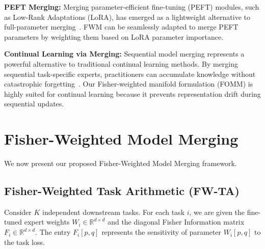 \documentclass{article}
\theoremstyle{plain}
\theoremstyle{definition}
\theoremstyle{remark}
\begin{document}
\textbf{PEFT Merging:} Merging parameter-efficient fine-tuning (PEFT) modules, such as Low-Rank Adaptations (LoRA), has emerged as a lightweight alternative to full-parameter merging~\cite{Zhang2023LoRAPruneSP, Zeng2025RobustMergePM, Zeng2025ParameterEM, Rivera2025COLORAEF, Quarantiello2024AdaptiveLM, Zhang2025LoRIRC}. FWM can be seamlessly adapted to merge PEFT parameters by weighting them based on LoRA parameter importance.

\textbf{Continual Learning via Merging:} Sequential model merging represents a powerful alternative to traditional continual learning methods. By merging sequential task-specific experts, practitioners can accumulate knowledge without catastrophic forgetting~\cite{Marczak2024MagMaxLM, Sokar2025ContinualLI, Feng2025AIMMergingAI, Yang2025OptimizedMM, Wang2026RevitalizingTB}. Our Fisher-weighted manifold formulation (FOMM) is highly suited for continual learning because it prevents representation drift during sequential updates.

\section{Fisher-Weighted Model Merging}
\label{sec:method}

We now present our proposed Fisher-Weighted Model Merging framework.

\subsection{Fisher-Weighted Task Arithmetic (FW-TA)}
Consider $K$ independent downstream tasks. For each task $i$, we are given the fine-tuned expert weights $W_i \in \mathbb{R}^{d \times d}$ and the diagonal Fisher Information matrix $F_i \in \mathbb{R}^{d \times d}$. The entry $F_i[p, q]$ represents the sensitivity of parameter $W_i[p, q]$ to the task loss.
\end{document}
